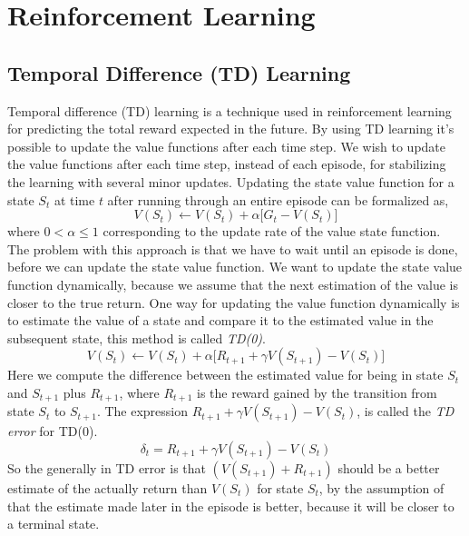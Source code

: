 \documentclass[11pt]{article}
\begin{document}
\maketitle


\section{Reinforcement Learning}



\subsection{Temporal Difference (TD) Learning}

Temporal difference (TD) learning is a technique used in reinforcement learning for predicting the total reward expected in the future. By using TD learning it's possible to update the value functions after each time step. We wish to update the value functions after each time step, instead of each episode, for stabilizing the learning with several minor updates. Updating the state value function for a state $S_{t}$ at time $t$ after running through an entire episode can be formalized as,
\begin{equation}\label{eq:td}
    V(S_{t}) \leftarrow V(S_{t}) + \alpha \big[G_{t} - V(S_{t}) \big]
\end{equation}
where $0 < \alpha \leq 1$ corresponding to the update rate of the value state function. The problem with this approach is that we have to wait until an episode is done, before we can update the state value function. We want to update the state value function dynamically, because we assume that the next estimation of the value is closer to the true return. One way for updating the value function dynamically is to estimate the value of a state and compare it to the estimated value in the subsequent state, this method is called \textit{TD(0)}.
\begin{equation}\label{eq:td2}
    V(S_{t}) \leftarrow V(S_{t}) + \alpha \big[R_{t + 1} + \gamma V(S_{t + 1}) - V(S_{t}) \big]
\end{equation}
Here we compute the difference between the estimated value for being in state $S_{t}$ and $S_{t + 1}$ plus $R_{t + 1}$, where $R_{t + 1}$ is the reward gained by the transition from state $S_{t}$ to $S_{t + 1}$. The expression $R_{t + 1} + \gamma V(S_{t + 1}) - V(S_{t})$, is called the \textit{TD error} for TD(0).
\begin{equation}
    \delta_{t} = R_{t + 1} + \gamma V(S_{t + 1}) - V(S_{t})
\end{equation}
So the generally in TD error is that $(V(S_{t + 1}) + R_{t + 1})$ should be a better estimate of the actually return than $V(S_{t})$ for state $S_{t}$, by the assumption of that the estimate made later in the episode is better, because it will be closer to a terminal state.  
\end{document}
